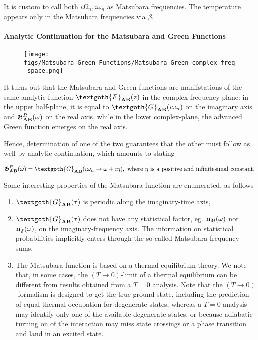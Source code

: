 It is custom to call both $i\Omega_n, i\omega_n$ as Matsubara frequencies. The temperature appears only in the Matsubara frequencies via $\beta$. \\

\paragraph{Analytic Continuation for the Matsubara and Green Functions}

\begin{wrapfigure}{l}{0.3\textwidth}
\texttt{[image: figs/Matsubara\_Green\_Functions/Matsubara\_Green\_complex\_freq\_space.png]}
\end{wrapfigure} 

It turns out that the Matsubara and Green functions are manifstations of the same analytic function $\textgoth{F}_{{\bf AB}}(z)$ in the complex-frequency plane: in the upper half-plane, it is equal to ${\textgoth{G}_{{\bf AB}}}(i\omega_n)$ on the imaginary axis and $\mathfrak{G}^{R}_{{\bf AB}}(\omega)$ on the real axis, while in the lower complex-plane, the advanced Green function emerges on the real axis. 

Hence, determination of one of the two guarantees that the other must follow as well by analytic continuation, which amounts to stating 

\begin{equation}
    \mathfrak{G}_{{\bf AB}}^R(\omega) = \textgoth{G}_{{\bf AB}}(i\omega_n \rightarrow \omega + i \eta), \textnormal{ where $\eta$ is a positive and infinitesimal constant}.
\end{equation}

Some interesting properties of the Matsubara function are enumerated, as follows 

\begin{enumerate}
    \item $\textgoth{G}_{{\bf AB}}(\tau)$ is periodic along the imaginary-time axis,
    \item $\textgoth{G}_{{\bf AB}}(\tau)$ does not have any statistical factor, eg. ${\bf n}_{\mathfrak{B}}(\omega)$ nor ${\bf n}_{\mathfrak{F}}(\omega)$, on the imaginary-frequency axis. The information on statistical probabilities implicitly enters through the so-called Matsubara frequency sums. 
    \item The Matsubara function is based on a thermal equilibrium theory. We note that, in some cases, the $(T \rightarrow 0)$-limit of a thermal equilibrium can be different from results obtained from a $T = 0$ analysis. Note that the $(T \rightarrow 0)$-formalism is designed to get the true ground state, including the prediction of equal thermal occupation for degenerate states, whereas a $T = 0$ analysis may identify only one of the available degenerate states, or because adiabatic turning on of the interaction may miss state crossings or a phase transition and land in an excited state. 
\end{enumerate}

